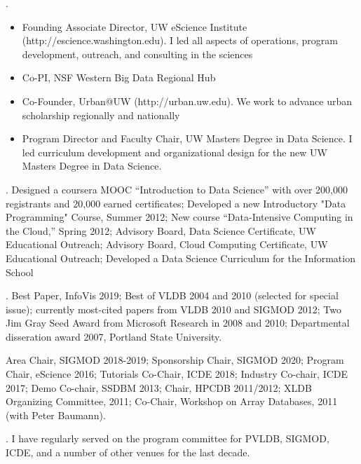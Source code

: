 \documentclass[10pt]{article}
\begin{document}
\begin{cv}{}
. 
\begin{itemize}
\item Founding Associate Director, UW eScience Institute (http://escience.washington.edu). I led all aspects of operations, program development, outreach, and consulting in the sciences 
\item Co-PI, NSF Western Big Data Regional Hub 
\item Co-Founder, Urban@UW (http://urban.uw.edu). We work to advance urban scholarship regionally and nationally
\item Program Director and Faculty Chair, UW Masters Degree in Data Science.  I led curriculum development and organizational design for the new UW Masters Degree in Data Science.
\end{itemize}

\vspace{0.5em}
. Designed a coursera MOOC ``Introduction to Data Science'' with over 200,000 registrants and 20,000 earned certificates; Developed a new Introductory "Data Programming" Course, Summer 2012; New course ``Data-Intensive Computing in the Cloud,'' Spring 2012; Advisory Board, Data Science Certificate, UW Educational Outreach; Advisory Board, Cloud Computing Certificate, UW Educational Outreach; Developed a Data Science Curriculum for the Information School

\vspace{0.5em}
.  Best Paper, InfoVis 2019; Best of VLDB 2004 and 2010 (selected for special issue); currently most-cited papers from VLDB 2010 and SIGMOD 2012; Two Jim Gray Seed Award from Microsoft Research in 2008 and 2010; Departmental disseration award 2007, Portland State University.

\vspace{0.5em}
 Area Chair, SIGMOD 2018-2019; Sponsorship Chair, SIGMOD 2020; Program Chair, eScience 2016; Tutorials Co-Chair, ICDE 2018; Industry Co-chair, ICDE 2017; Demo Co-chair, SSDBM 2013; Chair, HPCDB 2011/2012; XLDB Organizing Committee, 2011; Co-Chair, Workshop on Array Databases, 2011 (with Peter Baumann).

\vspace{0.5em}
. I have regularly served on the program committee for PVLDB, SIGMOD, ICDE, and a number of other venues for the last decade.

\end{cv}
\end{document}
